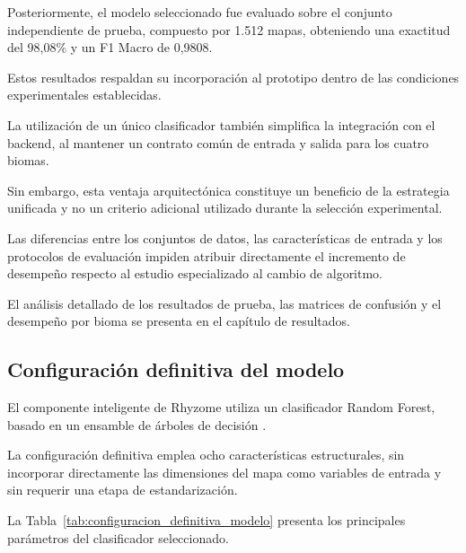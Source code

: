 Posteriormente, el modelo seleccionado fue evaluado sobre el conjunto independiente de prueba, compuesto por 1.512 mapas, obteniendo una exactitud del 98,08\% y un F1 Macro de 0,9808.

Estos resultados respaldan su incorporación al prototipo dentro de las condiciones experimentales establecidas.

La utilización de un único clasificador también simplifica la integración con el backend, al mantener un contrato común de entrada y salida para los cuatro biomas.

Sin embargo, esta ventaja arquitectónica constituye un beneficio de la estrategia unificada y no un criterio adicional utilizado durante la selección experimental.

Las diferencias entre los conjuntos de datos, las características de entrada y los protocolos de evaluación impiden atribuir directamente el incremento de desempeño respecto al estudio especializado al cambio de algoritmo.

El análisis detallado de los resultados de prueba, las matrices de confusión y el desempeño por bioma se presenta en el capítulo de resultados.


\subsection{Configuración definitiva del modelo}
\label{subsec:configuracion_definitiva_modelos}

El componente inteligente de Rhyzome utiliza un clasificador Random Forest, basado en un ensamble de árboles de decisión \parencite{breiman2001}.

La configuración definitiva emplea ocho características estructurales, sin incorporar directamente las dimensiones del mapa como variables de entrada y sin requerir una etapa de estandarización.

La Tabla~\ref{tab:configuracion_definitiva_modelo} presenta los principales parámetros del clasificador seleccionado.

